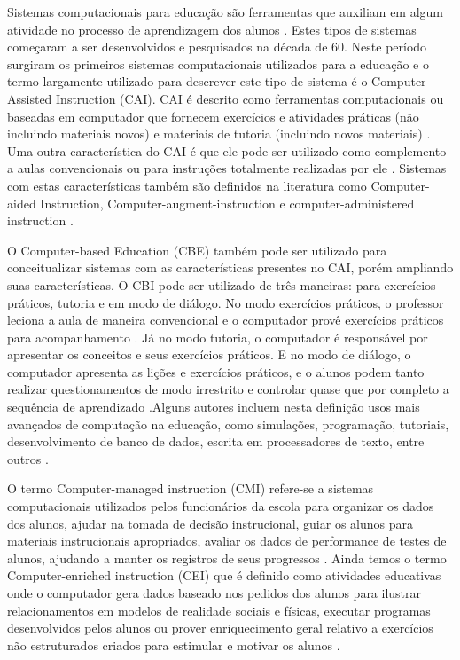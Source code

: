 Sistemas computacionais para educação são ferramentas que auxiliam em algum atividade no processo de aprendizagem dos alunos \cite{tchounikine11}. Estes tipos de sistemas começaram a ser desenvolvidos e pesquisados na década de 60. Neste período surgiram os primeiros sistemas computacionais utilizados para a educação e o termo largamente utilizado para descrever este tipo de sistema é o Computer-Assisted Instruction (CAI). CAI é descrito como ferramentas computacionais ou baseadas em computador que fornecem exercícios e atividades práticas (não incluindo materiais novos) e materiais de tutoria (incluindo novos materiais) \cite{wheres98}. Uma outra característica do CAI é que ele pode ser utilizado como complemento a aulas convencionais ou para instruções totalmente realizadas por ele \cite{cotton91}. Sistemas com estas características também são definidos na literatura como Computer-aided Instruction, Computer-augment-instruction e computer-administered instruction \cite{effectiveness85}.

O Computer-based Education (CBE) também pode ser utilizado para conceitualizar sistemas com as características presentes no CAI, porém ampliando suas características. O CBI pode ser utilizado de três maneiras: para exercícios práticos, tutoria e em modo de diálogo. No modo exercícios práticos, o  professor leciona a aula de maneira convencional e o computador provê exercícios práticos para acompanhamento \cite{wheres98}. Já no modo tutoria, o computador é responsável por apresentar os conceitos e seus exercícios práticos. E no modo de diálogo, o computador apresenta as lições e exercícios práticos, e o alunos podem tanto realizar questionamentos de modo irrestrito e controlar quase que por completo a sequência de aprendizado \cite{wheres98}.Alguns autores incluem nesta definição usos mais avançados de computação na educação, como simulações, programação, tutoriais, desenvolvimento de banco de dados, escrita em processadores de texto, entre outros \cite{cotton91}.

O termo Computer-managed instruction (CMI) refere-se a sistemas computacionais utilizados pelos funcionários da escola para organizar os dados dos alunos, ajudar na tomada de decisão instrucional, guiar os alunos para materiais instrucionais apropriados, avaliar os dados de performance de testes de alunos, ajudando a manter os registros de seus progressos \cite{cotton91, wheres98}. Ainda temos o termo Computer-enriched instruction (CEI) que é definido como atividades educativas onde o computador gera dados baseado nos pedidos dos alunos para ilustrar relacionamentos em modelos de realidade sociais e físicas, executar programas desenvolvidos pelos alunos ou prover enriquecimento geral relativo a exercícios não estruturados criados para estimular e motivar os alunos \cite{cotton91}.

